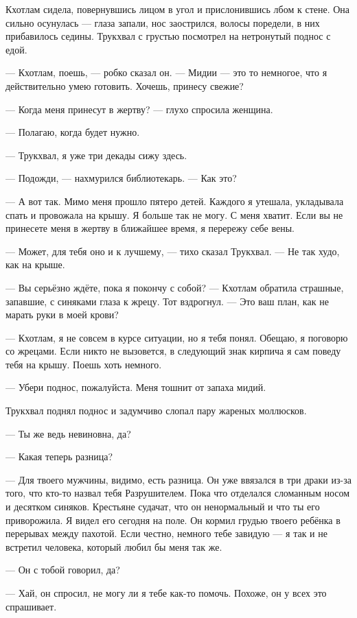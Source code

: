 \documentclass[a4paper,10pt,fleqn]{book}\usepackage{cooltooltips}\usepackage{polyglossia}\setdefaultlanguage{english}\setotherlanguage{russian}\defaultfontfeatures{Ligatures=TeX,Mapping=tex-text} \usepackage{xcolor}\definecolor{lightgray}{HTML}{bbbbbb}\color{lightgray}\newcommand{\ml}[3]{\textcolor{black}{#3}}
\begin{document}
Кхотлам сидела, повернувшись лицом в угол и прислонившись лбом к стене.
Она сильно осунулась --- глаза запали, нос заострился, волосы поредели, в них прибавилось седины.
Трукхвал с грустью посмотрел на нетронутый поднос с едой.

--- Кхотлам, поешь, --- робко сказал он.
--- Мидии --- это то немногое, что я действительно умею готовить.
Хочешь, принесу свежие?

--- Когда меня принесут в жертву? --- глухо спросила женщина.

--- Полагаю, когда будет нужно.

--- Трукхвал, я уже три декады сижу здесь.

--- Подожди, --- нахмурился библиотекарь.
--- Как это?

--- А вот так.
Мимо меня прошло пятеро детей.
Каждого я утешала, укладывала спать и провожала на крышу.
Я больше так не могу.
С меня хватит.
Если вы не принесете меня в жертву в ближайшее время, я перережу себе вены.

--- Может, для тебя оно и к лучшему, --- тихо сказал Трукхвал.
--- Не так худо, как на крыше.

--- Вы серьёзно ждёте, пока я покончу с собой? --- Кхотлам обратила страшные, запавшие, с синяками глаза к жрецу.
Тот вздрогнул.
--- Это ваш план, как не марать руки в моей крови?

--- Кхотлам, я не совсем в курсе ситуации, но я тебя понял.
Обещаю, я поговорю со жрецами.
Если никто не вызовется, в следующий знак кирпича я сам поведу тебя на крышу.
Поешь хоть немного.

--- Убери поднос, пожалуйста.
Меня тошнит от запаха мидий.

Трукхвал поднял поднос и задумчиво слопал пару жареных моллюсков.

--- Ты же ведь невиновна, да?

--- Какая теперь разница?

--- Для твоего мужчины, видимо, есть разница.
Он уже ввязался в три драки из-за того, что кто-то назвал тебя Разрушителем.
Пока что отделался сломанным носом и десятком синяков.
Крестьяне судачат, что он ненормальный и что ты его приворожила.
Я видел его сегодня на поле.
Он кормил грудью твоего ребёнка в перерывах между пахотой.
Если честно, немного тебе завидую --- я так и не встретил человека, который любил бы меня так же.

--- Он с тобой говорил, да?

--- Хай, он спросил, не могу ли я тебе как-то помочь.
Похоже, он у всех это спрашивает.
\end{document}

